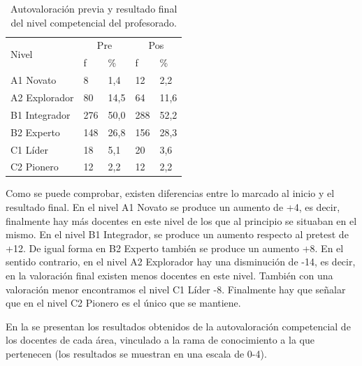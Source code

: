 \documentclass[spanish]{textolivre}
\begin{document}
\begin{table}[htpb]
\caption{Autovaloración previa y resultado final del nivel competencial del profesorado.}
\label{tab7}
\centering
\begin{tabular}{p{}p{}p{}p{}p{}}
\toprule
\multirow{2}{=}{Nivel} & \multicolumn{2}{c}{Pre} & \multicolumn{2}{c}{Pos}
\\
& f & \% & f & \%
\\
\midrule
A1 Novato & 8 & 1,4 & 12 & 2,2
\\
A2 Explorador & 80 & 14,5 & 64 & 11,6
\\
B1 Integrador & 276 & 50,0 & 288 & 52,2
\\
B2 Experto & 148 & 26,8 & 156 & 28,3
\\
C1 Líder & 18 & 5,1 & 20 & 3,6
\\
C2 Pionero & 12 & 2,2 & 12 & 2,2
\\ 
\bottomrule
\end{tabular}
\end{table}

Como se puede comprobar, existen diferencias entre lo marcado al inicio y el resultado final. En el nivel A1 Novato se produce un aumento de +4, es decir, finalmente hay más docentes en este nivel de los que al principio se situaban en el mismo. En el nivel B1 Integrador, se produce un aumento respecto al pretest de +12. De igual forma en B2 Experto también se produce un aumento +8. En el sentido contrario, en el nivel A2 Explorador hay una disminución de -14, es decir, en la valoración final existen menos docentes en este nivel. También con una valoración menor encontramos el nivel C1 Líder -8. Finalmente hay que señalar que en el nivel C2 Pionero es el único que se mantiene. 

En la  se presentan los resultados obtenidos de la autovaloración competencial de los docentes de cada área, vinculado a la rama de conocimiento a la que pertenecen (los resultados se muestran en una escala de 0-4).
\end{document}
